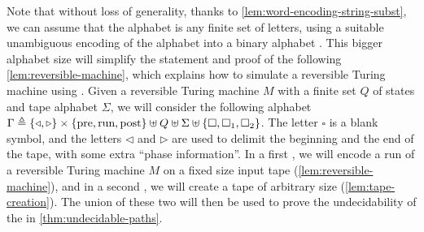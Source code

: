 Note that without loss of generality, thanks to
\cref{lem:word-encoding-string-subst}, we can assume that the alphabet is any
finite set of letters, using a suitable unambiguous encoding of the alphabet
into a binary alphabet \cite{BERST09}. This bigger alphabet size will simplify
the statement and proof of the following \cref{lem:reversible-machine}, which
explains how to simulate a reversible Turing machine using . Given a reversible Turing machine $M$ with a finite set $Q$ of
states and tape alphabet $\Sigma$, we will consider the following alphabet
$\Gamma \triangleq \{  \triangleleft, \triangleright  \} \times \{  \text{pre},
\text{run}, \text{post}  \} \uplus Q \uplus \Sigma \uplus \{  \square,
\square_1, \square_2 \}$. The letter $\square$ is a blank symbol, and the letters
$\triangleleft$ and $\triangleright$ are used to delimit the beginning and the
end of the tape, with some extra ``phase information''. In a first , we will encode a run of a reversible Turing machine $M$ on a
fixed size input tape (\cref{lem:reversible-machine}), and in a second
, we will create a tape of arbitrary size
(\cref{lem:tape-creation}). The union of these two  will then be used to prove the undecidability of the  in \cref{thm:undecidable-paths}.

